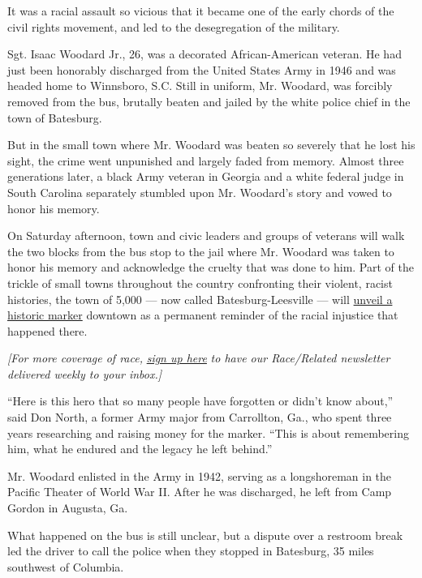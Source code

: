 It was a racial assault so vicious that it became one of the early
chords of the civil rights movement, and led to the desegregation of the
military.

Sgt. Isaac Woodard Jr., 26, was a decorated African-American veteran. He
had just been honorably discharged from the United States Army in 1946
and was headed home to Winnsboro, S.C. Still in uniform, Mr. Woodard,
was forcibly removed from the bus, brutally beaten and jailed by the
white police chief in the town of Batesburg.

But in the small town where Mr. Woodard was beaten so severely that he
lost his sight, the crime went unpunished and largely faded from memory.
Almost three generations later, a black Army veteran in Georgia and a
white federal judge in South Carolina separately stumbled upon Mr.
Woodard's story and vowed to honor his memory.

On Saturday afternoon, town and civic leaders and groups of veterans
will walk the two blocks from the bus stop to the jail where Mr. Woodard
was taken to honor his memory and acknowledge the cruelty that was done
to him. Part of the trickle of small towns throughout the country
confronting their violent, racist histories, the town of 5,000 --- now
called Batesburg-Leesville --- will
\href{https://www.postandcourier.com/columnists/column-a-cop-gouged-out-a-black-vet-s-eyes/article_b112cf02-2a7d-11e9-ad8c-07e0bc45c3aa.html}{unveil
a historic marker} downtown as a permanent reminder of the racial
injustice that happened there.

\emph{{[}For more coverage of race,}
\emph{\href{https://www.nytimes3xbfgragh.onion/2018/10/01/us/subscribe-race-related-newsletter.html?action=click\&module=inline\&pgtype=Article}{sign
up here}} \emph{to have our Race/Related newsletter delivered weekly to
your inbox.{]}}

``Here is this hero that so many people have forgotten or didn't know
about,'' said Don North, a former Army major from Carrollton, Ga., who
spent three years researching and raising money for the marker. ``This
is about remembering him, what he endured and the legacy he left
behind.''

Mr. Woodard enlisted in the Army in 1942, serving as a longshoreman in
the Pacific Theater of World War II. After he was discharged, he left
from Camp Gordon in Augusta, Ga.

What happened on the bus is still unclear, but a dispute over a restroom
break led the driver to call the police when they stopped in Batesburg,
35 miles southwest of Columbia.

